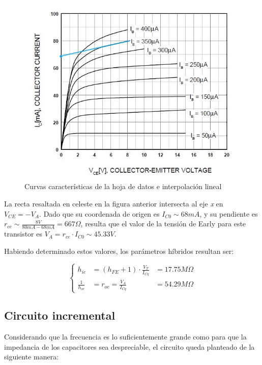 \documentclass[../../e1_tp1_main.tex]{subfiles}
\begin{document}
\begin{figure} [H]
	\centering
	\includegraphics[scale=0.8]{imagenes/early.jpg}
	\caption{Curvas caracter\'isticas de la hoja de datos e interpolaci\'on lineal}
\end{figure}

La recta resaltada en celeste en la figura anterior intersecta al eje \textit{x} en $V_{CE}=-V_A$. Dado que su coordenada de origen es $I_{C0}\sim 68mA$, y su pendiente es $r_{ce}\sim \frac{8V}{80mA-68mA} = 667\Omega$, resulta que el valor de la tensi\'on de Early para este transistor es $V_A = r_{ce} \cdot I_{C0} \sim 45.33V$.\par

Habiendo determinado estos valores, los par\'ametros h\'ibridos resultan ser:

 \[\left\{
\begin{aligned}
	h_{ie}&= (h_{FE}+1) \cdot \frac{V_T}{I_{Cq}} &= 17.75M\Omega\\
	\frac{1}{h_{oe}} &= r_{oe} = \frac{V_A}{I_{Cq}} &= 54.29M\Omega
 \end{aligned}
 \right.\]


\subsection{Circuito incremental} \label{ssection:2-circuito-incremental}

Considerando que la frecuencia es lo suficientemente grande como para que la impedancia de los capacitores sea despreciable, el circuito queda planteado de la siguiente manera:
\end{document}
